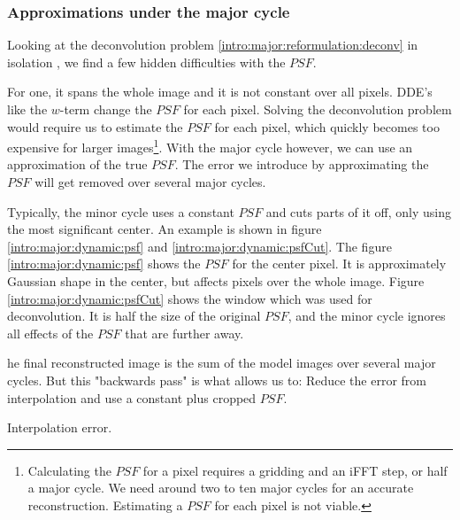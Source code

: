 \subsubsection{Approximations under the major cycle} \label{intro:major:approximations}
Looking at the deconvolution problem \eqref{intro:major:reformulation:deconv} in isolation , we find a few hidden difficulties with the $PSF$.

 For one, it spans the whole image and it is not constant over all pixels. DDE's like the $w$-term change the $PSF$ for each pixel. Solving the deconvolution problem would require us to estimate the $PSF$ for each pixel, which quickly becomes too expensive for larger images\footnote{Calculating the $PSF$ for a pixel requires a gridding and an iFFT step, or half a major cycle. We need around two to ten major cycles for an accurate reconstruction. Estimating a $PSF$ for each pixel is not viable.}. With the major cycle however, we can use an approximation of the true $PSF$. The error we introduce by approximating the $PSF$ will get removed over several major cycles. 

Typically, the minor cycle uses a constant $PSF$ and cuts parts of it off, only using the most significant center. An example is shown in figure \ref{intro:major:dynamic:psf} and \ref{intro:major:dynamic:psfCut}. The figure \ref{intro:major:dynamic:psf} shows the $PSF$ for the center pixel. It is approximately Gaussian shape in the center, but affects pixels over the whole image. Figure \ref{intro:major:dynamic:psfCut} shows the window which was used for deconvolution. It is half the size of the original $PSF$, and the minor cycle ignores all effects of the $PSF$ that are further away. 


he final reconstructed image is the sum of the model images over several major cycles. But this "backwards pass" is what allows us to: Reduce the error from interpolation and use a constant plus cropped $PSF$.

Interpolation error.

